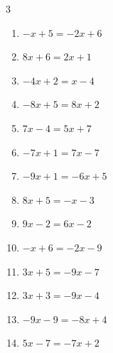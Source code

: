 \begin{multicols}{3}
\begin{enumerate}
  \item $-x+5=-2x+6$

        \phantom{$\displaystyle x=1$}

  \item $8x+6=2x+1$


  \item $-4x+2=x-4$


  \item $-8x+5=8x+2$


  \item $7x-4=5x+7$


  \item $-7x+1=7x-7$


  \item $-9x+1=-6x+5$


  \item $8x+5=-x-3$


  \item $9x-2=6x-2$

        \phantom{$\displaystyle x=0$}

  \item $-x+6=-2x-9$

        \phantom{$\displaystyle x=-15$}

  \item $3x+5=-9x-7$

        \phantom{$\displaystyle x=-1$}

  \item $3x+3=-9x-4$


  \item $-9x-9=-8x+4$

        \phantom{$\displaystyle x=-13$}

\columnbreak %

  \item $5x-7=-7x+2$


\end{enumerate}
\end{multicols}
